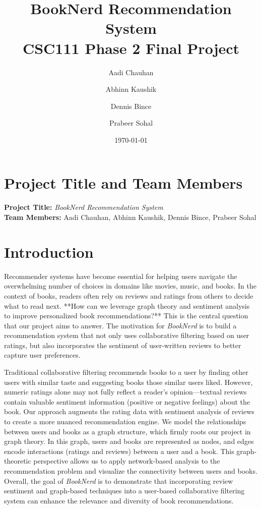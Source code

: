\documentclass[11pt]{article}
\title{\textbf{BookNerd Recommendation System}\\\large CSC111 Phase 2 Final Project}
\author{Aadi Chauhan \and Abhinn Kaushik \and Dennis Bince \and Prabeer Sohal}
\date{\today}
\begin{document}
\maketitle

\section*{Project Title and Team Members}
\noindent \textbf{Project Title:} \textit{BookNerd Recommendation System} \\
\noindent \textbf{Team Members:} Aadi Chauhan, Abhinn Kaushik, Dennis Bince, Prabeer Sohal

\section{Introduction}
Recommender systems have become essential for helping users navigate the overwhelming number of choices in domains like movies, music, and books. In the context of books, readers often rely on reviews and ratings from others to decide what to read next. **How can we leverage graph theory and sentiment analysis to improve personalized book recommendations?** This is the central question that our project aims to answer. The motivation for \textit{BookNerd} is to build a recommendation system that not only uses collaborative filtering based on user ratings, but also incorporates the sentiment of user-written reviews to better capture user preferences. 

Traditional collaborative filtering recommends books to a user by finding other users with similar taste and suggesting books those similar users liked. However, numeric ratings alone may not fully reflect a reader’s opinion—textual reviews contain valuable sentiment information (positive or negative feelings) about the book. Our approach augments the rating data with sentiment analysis of reviews to create a more nuanced recommendation engine. We model the relationships between users and books as a graph structure, which firmly roots our project in graph theory. In this graph, users and books are represented as nodes, and edges encode interactions (ratings and reviews) between a user and a book. This graph-theoretic perspective allows us to apply network-based analysis to the recommendation problem and visualize the connectivity between users and books. Overall, the goal of \textit{BookNerd} is to demonstrate that incorporating review sentiment and graph-based techniques into a user-based collaborative filtering system can enhance the relevance and diversity of book recommendations.
\end{document}
